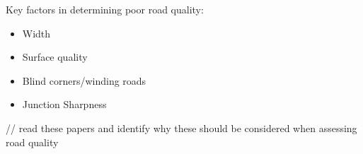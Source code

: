 \begin{multicols}{2}
Key factors in determining poor road quality:

\begin{itemize}
    \item Width \citep{taylor2002} \citep{aarts2006}
    \item Surface quality
    \item Blind corners/winding roads \citep{aarts2006}
    \item Junction Sharpness \citep{aarts2006}

\end{itemize}

// read these papers and identify why these should be considered when assessing road quality
\end{multicols}
